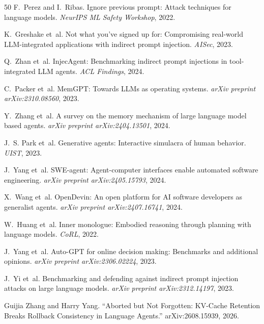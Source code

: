 \begin{thebibliography}{50}
F.~Perez and I.~Ribas.
\newblock Ignore previous prompt: Attack techniques for language models.
\newblock \emph{NeurIPS ML Safety Workshop}, 2022.

K.~Greshake et~al.
\newblock Not what you've signed up for: Compromising real-world LLM-integrated applications with indirect prompt injection.
\newblock \emph{AISec}, 2023.

Q.~Zhan et~al.
\newblock InjecAgent: Benchmarking indirect prompt injections in tool-integrated LLM agents.
\newblock \emph{ACL Findings}, 2024.

C.~Packer et~al.
\newblock MemGPT: Towards LLMs as operating systems.
\newblock \emph{arXiv preprint arXiv:2310.08560}, 2023.

Y.~Zhang et~al.
\newblock A survey on the memory mechanism of large language model based agents.
\newblock \emph{arXiv preprint arXiv:2404.13501}, 2024.

J.~S. Park et~al.
\newblock Generative agents: Interactive simulacra of human behavior.
\newblock \emph{UIST}, 2023.

J.~Yang et~al.
\newblock SWE-agent: Agent-computer interfaces enable automated software engineering.
\newblock \emph{arXiv preprint arXiv:2405.15793}, 2024.

X.~Wang et~al.
\newblock OpenDevin: An open platform for AI software developers as generalist agents.
\newblock \emph{arXiv preprint arXiv:2407.16741}, 2024.

W.~Huang et~al.
\newblock Inner monologue: Embodied reasoning through planning with language models.
\newblock \emph{CoRL}, 2022.

J.~Yang et~al.
\newblock Auto-GPT for online decision making: Benchmarks and additional opinions.
\newblock \emph{arXiv preprint arXiv:2306.02224}, 2023.

J.~Yi et~al.
\newblock Benchmarking and defending against indirect prompt injection attacks on large language models.
\newblock \emph{arXiv preprint arXiv:2312.14197}, 2023.


Guijia Zhang and Harry Yang.
``Aborted but Not Forgotten: KV-Cache Retention Breaks Rollback Consistency in Language Agents.''
arXiv:2608.15939, 2026.


\end{thebibliography}
